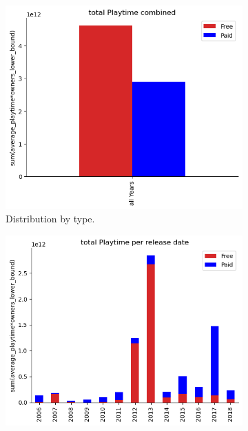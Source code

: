 \documentclass[11pt]{article}
\begin{document}
\begin{figure}
    \centering
    \begin{subfigure}[b]{0.475\textwidth}
        \centering
        \includegraphics[width=1\textwidth]{graphics/insight1_graph1.png}
        \caption{Distribution by type.}
        \label{fig:insight1_1}
    \end{subfigure}
    \hfill
    \begin{subfigure}[b]{0.475\textwidth}
        \centering
        \includegraphics[width=1\textwidth]{graphics/insight1_graph2.png}

\end{subfigure}
\end{figure}
\end{document}

